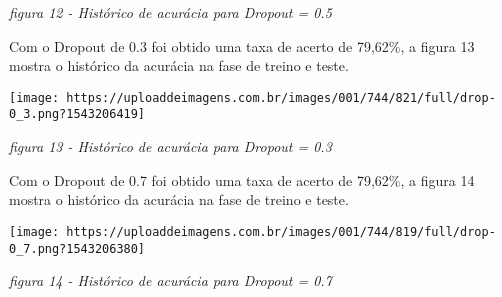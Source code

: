 \documentclass[11pt]{article}
\makeatletter
\def\maxwidth{\ifdim\Gin@nat@width>\linewidth\linewidth
    \else\Gin@nat@width\fi}
\let\Oldincludegraphics\includegraphics
\renewcommand{\includegraphics}[1]{\Oldincludegraphics[width=.8\maxwidth]{#1}}
\makeatother
\begin{document}
\emph{figura 12 - Histórico de acurácia para Dropout = 0.5}

Com o Dropout de 0.3 foi obtido uma taxa de acerto de 79,62\%, a figura
13 mostra o histórico da acurácia na fase de treino e teste.

\texttt{[image: https://uploaddeimagens.com.br/images/001/744/821/full/drop-0\_3.png?1543206419]}

\emph{figura 13 - Histórico de acurácia para Dropout = 0.3}

Com o Dropout de 0.7 foi obtido uma taxa de acerto de 79,62\%, a figura
14 mostra o histórico da acurácia na fase de treino e teste.

\texttt{[image: https://uploaddeimagens.com.br/images/001/744/819/full/drop-0\_7.png?1543206380]}

\emph{figura 14 - Histórico de acurácia para Dropout = 0.7}
\end{document}
